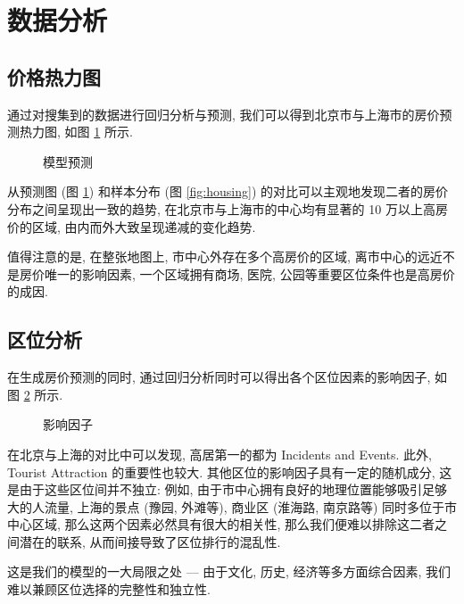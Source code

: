 \section{数据分析}
\subsection{价格热力图}
通过对搜集到的数据进行回归分析与预测, 我们可以得到北京市与上海市的房价预测热力图, 如图 \ref{fig:predict} 所示.

\begin{figure}[H]
  \centering
  \caption{模型预测}
  \label{fig:predict}
\end{figure}

从预测图 (图 \ref{fig:predict}) 和样本分布 (图 \ref{fig:housing}) 的对比可以主观地发现二者的房价分布之间呈现出一致的趋势, 在北京市与上海市的中心均有显著的 10 万以上高房价的区域, 由内而外大致呈现递减的变化趋势.

值得注意的是, 在整张地图上, 市中心外存在多个高房价的区域, 离市中心的远近不是房价唯一的影响因素, 一个区域拥有商场, 医院, 公园等重要区位条件也是高房价的成因.

\subsection{区位分析}
在生成房价预测的同时, 通过回归分析同时可以得出各个区位因素的影响因子, 如图 \ref{fig:impact} 所示.

\begin{figure}[H]
  \centering
  \caption{影响因子}
  \label{fig:impact}
\end{figure}

在北京与上海的对比中可以发现, 高居第一的都为 Incidents and Events.
此外, Tourist Attraction 的重要性也较大.
其他区位的影响因子具有一定的随机成分, 这是由于这些区位间并不独立:
例如, 由于市中心拥有良好的地理位置能够吸引足够大的人流量, 上海的景点 (豫园, 外滩等), 商业区 (淮海路, 南京路等) 同时多位于市中心区域, 那么这两个因素必然具有很大的相关性, 那么我们便难以排除这二者之间潜在的联系, 从而间接导致了区位排行的混乱性.

这是我们的模型的一大局限之处 --- 由于文化, 历史, 经济等多方面综合因素, 我们难以兼顾区位选择的完整性和独立性.

